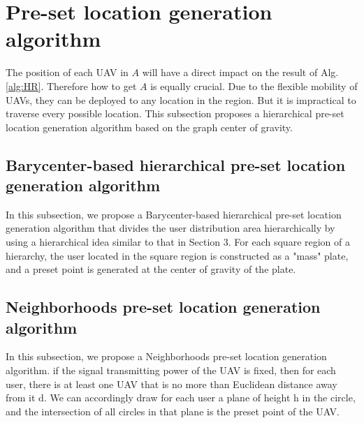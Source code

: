 \documentclass[journal]{IEEEtran}
\begin{document}
\section{Pre-set location generation algorithm}
The position of each UAV in $A$ will have a direct impact on the result of Alg.\ref{alg:HR}. Therefore how to get $A$ is equally crucial. Due to the flexible mobility of UAVs, they can be deployed to any location in the region. But it is impractical to traverse every possible location. This subsection proposes a hierarchical pre-set location generation algorithm based on the graph center of gravity.



%
\subsection{Barycenter-based hierarchical pre-set location generation algorithm}
In this subsection, we propose a Barycenter-based hierarchical pre-set location generation algorithm that divides the user distribution area hierarchically by using a hierarchical idea similar to that in Section 3. For each square region of a hierarchy, the user located in the square region is constructed as a "mass" plate, and a preset point is generated at the center of gravity of the plate.

\subsection{Neighborhoods pre-set location generation algorithm}
In this subsection, we propose a Neighborhoods pre-set location generation algorithm. if the signal transmitting power of the UAV is fixed, then for each user, there is at least one UAV that is no more than Euclidean distance away from it d. We can accordingly draw for each user a plane of height h in the circle, and the intersection of all circles in that plane is the preset point of the UAV.
\end{document}
